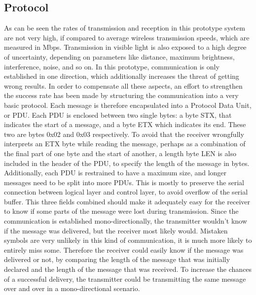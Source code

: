 \subsection{Protocol}
As can be seen the rates of transmission and reception in this prototype system are not very high, if compared to average wireless transmission speeds, which are measured in Mbps.
Transmission in visible light is also exposed to a high degree of uncertainty, depending on parameters like distance, maximum brightness, interference, noise, and so on.
In this prototype, communication is only established in one direction, which additionally increases the threat of getting wrong results.
In order to compensate all these aspects, an effort to strengthen the success rate has been made by structuring the communication into a very basic protocol.
Each message is therefore encapsulated into a Protocol Data Unit, or PDU.
Each PDU is enclosed between two single bytes: a byte STX, that indicates the start of a message, and a byte ETX which indicates its end. 
These two are bytes 0x02 and 0x03 respectively.
To avoid that the receiver wrongfully interprets an ETX byte while reading the message, perhaps as a combination of the final part of one byte and the start of another, a length byte LEN is also included in the header of the PDU, to specify the length of the message in bytes.
Additionally, each PDU is restrained to have a maximum size, and longer messages need to be split into more PDUs.
This is mostly to preserve the serial connection between logical layer and control layer, to avoid overflow of the serial buffer.
This three fields combined should make it adequately easy for the receiver to know if some parts of the message were lost during transmission.
Since the communication is established mono-directionally, the transmitter wouldn't know if the message was delivered, but the receiver most likely would.
Mistaken symbols are very unlikely in this kind of communication, it is much more likely to entirely miss some.
Therefore the receiver could easily know if the message was delivered or not, by comparing the length of the message that was initially declared and the length of the message that was received.
To increase the chances of a successful delivery, the transmitter could be transmitting the same message over and over in a mono-directional scenario.


